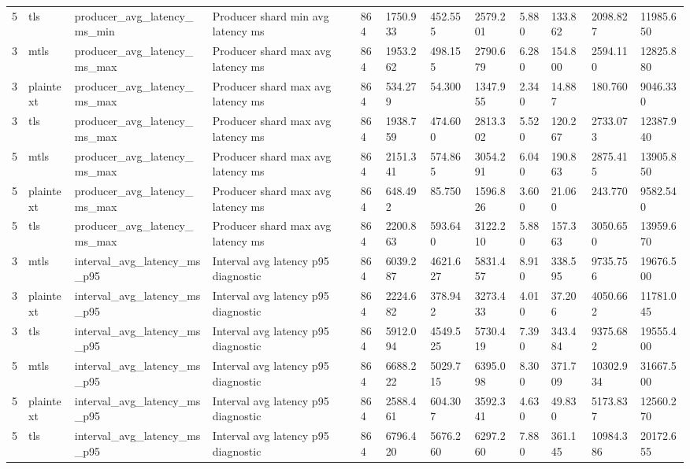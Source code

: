 \begin{longtable}{llllllllllll}
5 & tls & producer\_avg\_latency\_ms\_min & Producer shard min avg latency ms & 864 & 1750.933 & 452.555 & 2579.201 & 5.880 & 133.862 & 2098.827 & 11985.650 \\
3 & mtls & producer\_avg\_latency\_ms\_max & Producer shard max avg latency ms & 864 & 1953.262 & 498.155 & 2790.679 & 6.280 & 154.800 & 2594.110 & 12825.880 \\
3 & plaintext & producer\_avg\_latency\_ms\_max & Producer shard max avg latency ms & 864 & 534.279 & 54.300 & 1347.955 & 2.340 & 14.887 & 180.760 & 9046.330 \\
3 & tls & producer\_avg\_latency\_ms\_max & Producer shard max avg latency ms & 864 & 1938.759 & 474.600 & 2813.302 & 5.520 & 120.267 & 2733.073 & 12387.940 \\
5 & mtls & producer\_avg\_latency\_ms\_max & Producer shard max avg latency ms & 864 & 2151.341 & 574.865 & 3054.291 & 6.040 & 190.863 & 2875.415 & 13905.850 \\
5 & plaintext & producer\_avg\_latency\_ms\_max & Producer shard max avg latency ms & 864 & 648.492 & 85.750 & 1596.826 & 3.600 & 21.060 & 243.770 & 9582.540 \\
5 & tls & producer\_avg\_latency\_ms\_max & Producer shard max avg latency ms & 864 & 2200.863 & 593.640 & 3122.210 & 5.880 & 157.363 & 3050.650 & 13959.670 \\
3 & mtls & interval\_avg\_latency\_ms\_p95 & Interval avg latency p95 diagnostic & 864 & 6039.287 & 4621.627 & 5831.457 & 8.910 & 338.595 & 9735.756 & 19676.500 \\
3 & plaintext & interval\_avg\_latency\_ms\_p95 & Interval avg latency p95 diagnostic & 864 & 2224.682 & 378.942 & 3273.433 & 4.010 & 37.206 & 4050.662 & 11781.045 \\
3 & tls & interval\_avg\_latency\_ms\_p95 & Interval avg latency p95 diagnostic & 864 & 5912.094 & 4549.525 & 5730.419 & 7.390 & 343.484 & 9375.682 & 19555.400 \\
5 & mtls & interval\_avg\_latency\_ms\_p95 & Interval avg latency p95 diagnostic & 864 & 6688.222 & 5029.715 & 6395.098 & 8.300 & 371.709 & 10302.934 & 31667.500 \\
5 & plaintext & interval\_avg\_latency\_ms\_p95 & Interval avg latency p95 diagnostic & 864 & 2588.461 & 604.307 & 3592.341 & 4.630 & 49.830 & 5173.837 & 12560.270 \\
5 & tls & interval\_avg\_latency\_ms\_p95 & Interval avg latency p95 diagnostic & 864 & 6796.420 & 5676.260 & 6297.260 & 7.880 & 361.145 & 10984.386 & 20172.655 \\

\end{longtable}
